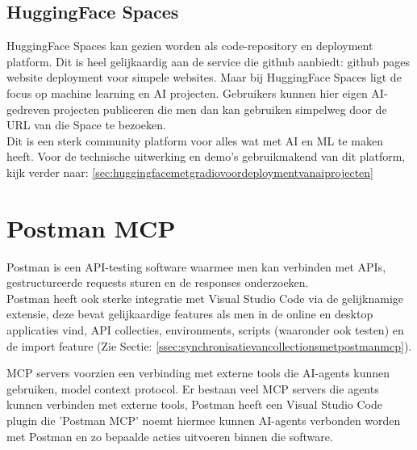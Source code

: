 \subsection{HuggingFace Spaces}
\label{sec:huggingfacespaces}
HuggingFace Spaces kan gezien worden als code-repository en deployment platform. Dit is heel gelijkaardig aan de service die github aanbiedt: github pages website deployment voor simpele websites. Maar bij HuggingFace Spaces ligt de focus op machine learning en AI projecten. Gebruikers kunnen hier eigen AI-gedreven projecten publiceren die men dan kan gebruiken simpelweg door de URL van die Space te bezoeken. \\

Dit is een sterk community platform voor alles wat met AI en ML te maken heeft. Voor de technische uitwerking en demo's gebruikmakend van dit platform, kijk verder naar: \ref{sec:huggingfacemetgradiovoordeploymentvanaiprojecten}

\section{Postman MCP}
\label{sec:postmanmcp}

Postman is een API-testing software waarmee men kan verbinden met APIs, gestructureerde requests sturen en de responses onderzoeken. \\

Postman heeft ook sterke integratie met Visual Studio Code via de gelijknamige extensie, deze bevat gelijkaardige features als men in de online en desktop applicaties vind, API collecties, environments, scripts (waaronder ook testen) en de import feature (Zie Sectie: \ref{ssec:synchronisatievancollectionsmetpostmanmcp}).

MCP servers voorzien een verbinding met externe tools die AI-agents kunnen gebruiken, model context protocol. Er bestaan veel MCP servers die agents kunnen verbinden met externe tools, Postman heeft een Visual Studio Code plugin die 'Postman MCP' noemt hiermee kunnen AI-agents verbonden worden met Postman en zo bepaalde acties uitvoeren binnen die software. \\ %

